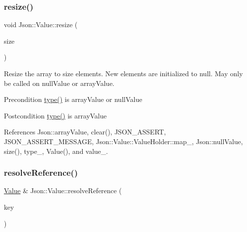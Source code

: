 \subsubsection{\texorpdfstring{resize()}{resize()}}
{\footnotesize\ttfamily void Json\+::\+Value\+::resize (\begin{DoxyParamCaption}\item[{\hyperlink{classJson_1_1Value_a184a91566cccca7b819240f0d5561c7d_a184a91566cccca7b819240f0d5561c7d}{Array\+Index}}]{size }\end{DoxyParamCaption})}

Resize the array to size elements. New elements are initialized to null. May only be called on null\+Value or array\+Value. \begin{DoxyPrecond}{Precondition}
\hyperlink{classJson_1_1Value_a8ce61157a011894f0252ceed232312de_a8ce61157a011894f0252ceed232312de}{type()} is array\+Value or null\+Value 
\end{DoxyPrecond}
\begin{DoxyPostcond}{Postcondition}
\hyperlink{classJson_1_1Value_a8ce61157a011894f0252ceed232312de_a8ce61157a011894f0252ceed232312de}{type()} is array\+Value 
\end{DoxyPostcond}


References Json\+::array\+Value, clear(), J\+S\+O\+N\+\_\+\+A\+S\+S\+E\+RT, J\+S\+O\+N\+\_\+\+A\+S\+S\+E\+R\+T\+\_\+\+M\+E\+S\+S\+A\+GE, Json\+::\+Value\+::\+Value\+Holder\+::map\+\_\+, Json\+::null\+Value, size(), type\+\_\+, Value(), and value\+\_\+.

\mbox{\label{classJson_1_1Value_a9ff9cdae2c8f4155bab603d750b0b3f1_a9ff9cdae2c8f4155bab603d750b0b3f1}} 
\subsubsection{\texorpdfstring{resolve\+Reference()}{resolveReference()}\hspace{0.1cm}{\footnotesize\ttfamily [1/2]}}
{\footnotesize\ttfamily \hyperlink{classJson_1_1Value}{Value} \& Json\+::\+Value\+::resolve\+Reference (\begin{DoxyParamCaption}\item[{const char $\ast$}]{key }\end{DoxyParamCaption})\hspace{0.3cm}{\ttfamily [private]}}



